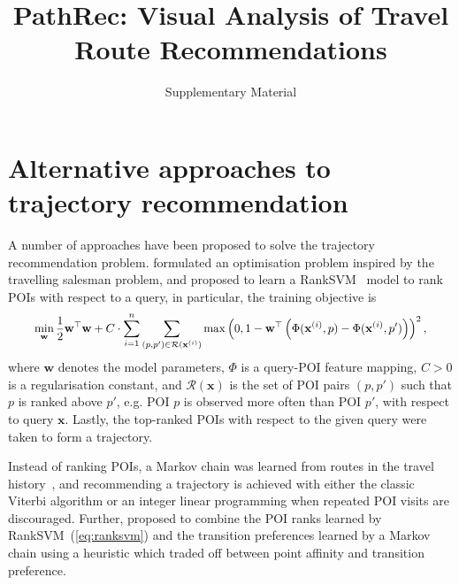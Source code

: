 \documentclass[sigconf]{acmart}
\newcommand{\TODO}[1]{\textcolor{red}{\bf{#1}}}
\begin{document}
\title{PathRec: Visual Analysis of Travel Route Recommendations}
\subtitle{Supplementary Material}
\maketitle

\thispagestyle{empty}

\appendix

\section{Alternative approaches to trajectory recommendation}
\label{sec:alternative}


A number of approaches have been proposed to solve the trajectory recommendation problem.
\citet{ijcai15} formulated an optimisation problem inspired by the travelling salesman problem,
and \citet{cikm16paper} proposed to learn a RankSVM~\cite{lranksvm} model to rank POIs with respect to a query,
in particular, 
the training objective is
\begin{equation}
\label{eq:ranksvm}
\resizebox{0.92\linewidth}{!}{$\displaystyle
\min_{\mathbf{w}} \frac{1}{2} \mathbf{w}^\top \mathbf{w} + C \cdot \sum_{i=1}^n \sum_{(p,p') \in \mathcal{R}(\mathbf{x}^{(i)})}
          \max\left(0, 1 - \mathbf{w}^\top \left(\Phi(\mathbf{x}^{(i)}, p) - \Phi(\mathbf{x}^{(i)}, p') \right) \right)^2,
$}
\end{equation}
where $\mathbf{w}$ denotes the model parameters, $\Phi$ is a query-POI feature mapping, $C > 0$ is a regularisation constant,
and $\mathcal{R}(\mathbf{x})$ is the set of POI pairs $(p, p')$ such that $p$ is ranked above $p'$,
e.g. POI $p$ is observed more often than POI $p'$, with respect to query $\mathbf{x}$.
Lastly, the top-ranked POIs with respect to the given query were taken to form a trajectory.

Instead of ranking POIs, a Markov chain was learned from routes in the travel history~\cite{cikm16paper},
and recommending a trajectory is achieved with either the classic Viterbi algorithm or 
an integer linear programming when repeated POI visits are discouraged.
Further, \citet{cikm16paper} proposed to combine the POI ranks learned by RankSVM~(\ref{eq:ranksvm}) and 
the transition preferences learned by a Markov chain using a heuristic which traded off between point affinity and transition preference.
\end{document}
